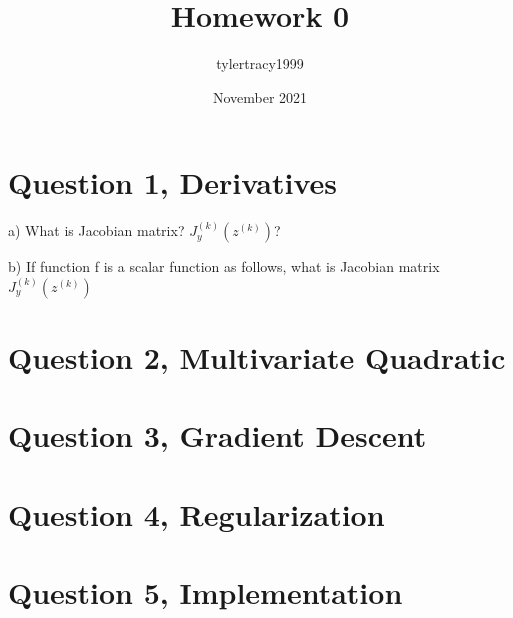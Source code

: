 \documentclass{article}
\title{Homework 0}
\author{tylertracy1999 }
\date{November 2021}
\begin{document}
\maketitle


\section*{Question 1, Derivatives}

a) What is Jacobian matrix? $J_y^{(k)}(z^{(k)})$?


b) If function f is a scalar function as follows, what is Jacobian matrix $J_y^{(k)}(z^{(k)})$

\section*{Question 2, Multivariate Quadratic}


\section*{Question 3, Gradient Descent}


\section*{Question 4, Regularization}


\section*{Question 5, Implementation}
\end{document}
